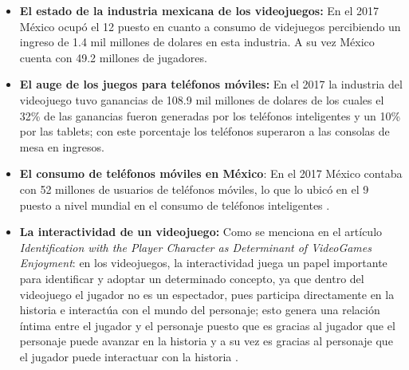 \begin{itemize}
	\item \textbf{El estado de la industria mexicana de los videojuegos:} En el 
	2017 México ocupó el 12 puesto en cuanto a consumo de videjuegos percibiendo 
	un ingreso de 1.4 mil millones de dolares en esta industria. A su vez México 
	cuenta con 49.2 millones de jugadores\cite{Ref_JuegosGanancia}.

	\item \textbf{El auge de los juegos para teléfonos móviles:} En el 2017 la 
	industria del videojuego tuvo ganancias de 108.9 mil millones de dolares de 
	los cuales el 32\% de las ganancias fueron generadas por los teléfonos 
	inteligentes y un 10\% por las tablets; con este porcentaje los teléfonos 
	superaron a las consolas de mesa en ingresos\cite{Ref_JuegosGanancia}. 

	\item \textbf{El consumo de teléfonos móviles en México}: En el 2017 México 
	contaba con 52 millones de usuarios de teléfonos móviles, lo que lo ubicó en 
	el 9 puesto a nivel mundial en el consumo de teléfonos inteligentes
	\cite{Ref_TelefonosGanancia}.

	\item \textbf{La interactividad de un videojuego:} Como se menciona en el 
	artículo \textit{Identification with the Player Character as Determinant 
	of VideoGames Enjoyment}: en los videojuegos, la interactividad juega un 
	papel importante para identificar y adoptar un determinado concepto, ya que 
	dentro del videojuego el jugador no es un espectador, pues participa 
	directamente en la historia e interactúa con el mundo del personaje; esto 
	genera una relación íntima entre el jugador y el personaje puesto que es 
	gracias al jugador que el personaje puede avanzar en la historia y a su vez 
	es gracias al personaje que el jugador puede interactuar con la historia
	\cite{PlayerIdentification}. 
\end{itemize}